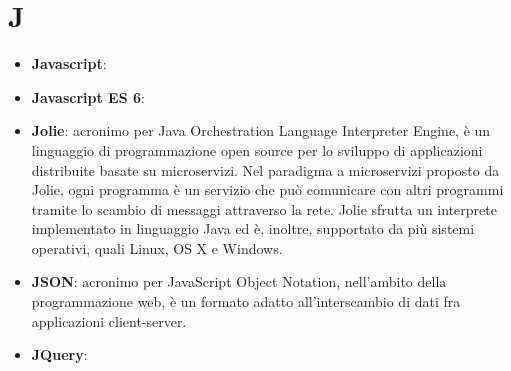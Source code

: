 \section{J}
\begin{itemize} 
	\item \textbf{Javascript}:
	\item \textbf{Javascript ES 6}:
	\item \textbf{Jolie}: acronimo per Java Orchestration Language Interpreter Engine, è un linguaggio di programmazione open source per lo sviluppo di applicazioni distribuite basate su microservizi. Nel paradigma a microservizi proposto da Jolie, ogni programma è un servizio che può comunicare con altri programmi tramite lo scambio di messaggi attraverso la rete. Jolie sfrutta un interprete implementato in linguaggio Java ed è, inoltre, supportato da più sistemi operativi, quali Linux, OS X e Windows.
	\item \textbf{JSON}: acronimo per JavaScript Object Notation, nell'ambito della programmazione web, è un formato adatto all'interscambio di dati fra applicazioni client-server.
	\item \textbf{JQuery}: 
\end{itemize}